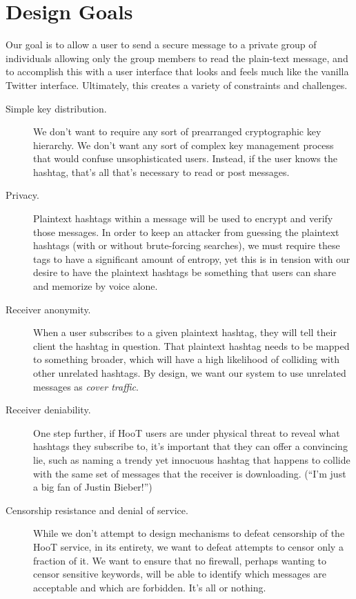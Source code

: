 \section{Design Goals}

Our goal is to allow a user to send a secure message to a private group of individuals allowing only the group members to read the plain-text message, and to accomplish this with a user interface that looks and feels much like the vanilla Twitter interface. Ultimately, this creates a variety of constraints and challenges.

\begin{description}
\item[Simple key distribution.] We don't want to require any sort of prearranged cryptographic key hierarchy. We don't want any sort of complex key management process that would confuse unsophisticated users.  Instead, if the user knows the hashtag, that's all that's necessary to read or post messages.

\item[Privacy.] Plaintext hashtags within a message will be used to encrypt and verify those messages.  In order to keep an attacker from guessing the plaintext hashtags (with or without brute-forcing searches), we must require these tags to have a significant amount of entropy, yet this is in tension with our desire to have the plaintext hashtags be something that users can share and memorize by voice alone.

\item[Receiver anonymity.]  When a user subscribes to a given plaintext hashtag, they will tell their client the hashtag in question. That plaintext hashtag needs to be mapped to something broader, which will have a high likelihood of colliding with other unrelated hashtags. By design, we want our system to use unrelated messages as {\em cover traffic}.

\item[Receiver deniability.] One step further, if HooT users are under physical threat to reveal what hashtags they subscribe to, it's important that they can offer a convincing lie, such as naming a trendy yet innocuous hashtag that happens to collide with the same set of messages that the receiver is downloading. (``I'm just a big fan of Justin Bieber!'')

\item[Censorship resistance and denial of service.] While we don't attempt to design mechanisms to defeat censorship of the HooT service, in its entirety, we want to defeat attempts to censor only a fraction of it. We want to ensure that no firewall, perhaps wanting to censor sensitive keywords, will be able to identify which messages are acceptable and which are forbidden. It's all or nothing. %


\end{description}
